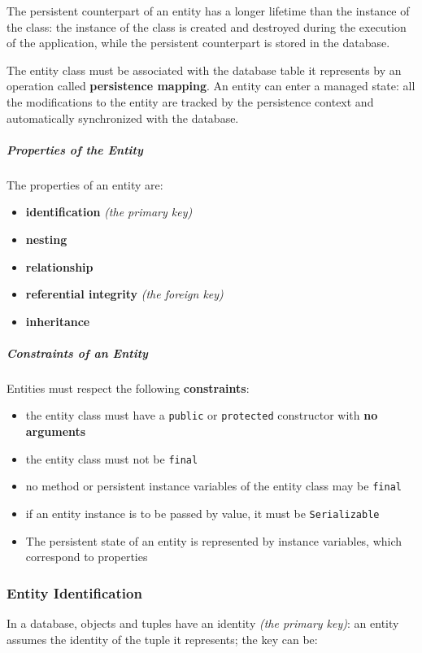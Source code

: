 \documentclass[english]{article}
\begin{document}
The persistent counterpart of an entity has a longer lifetime than the instance of the class:
the instance of the class is created and destroyed during the execution of the application, while the persistent counterpart is stored in the database.

The entity class must be associated with the database table it represents by an operation called \textbf{persistence mapping}.
An entity can enter a managed state: all the modifications to the entity are tracked by the persistence context and automatically synchronized with the database.

\subparagraph*{Properties of the Entity}
The properties of an entity are:

\begin{itemize}
  \item \textbf{identification} \textit{(the primary key)}
  \item \textbf{nesting}
  \item \textbf{relationship}
  \item \textbf{referential integrity} \textit{(the foreign key)}
  \item \textbf{inheritance}
\end{itemize}

\subparagraph*{Constraints of an Entity}

Entities must respect the following \textbf{constraints}:

\begin{itemize}
  \item the entity class must have a \texttt{public} or \texttt{protected} constructor with \textbf{no arguments}
  \item the entity class must not be \texttt{final}
  \item no method or persistent instance variables of the entity class may be \texttt{final}
  \item if an entity instance is to be passed by value, it must be \texttt{Serializable}
  \item The persistent state of an entity is represented by instance variables, which correspond to \javab properties
\end{itemize}

\subsubsection{Entity Identification}
In a database, objects and tuples have an identity \textit{(the primary key)}: an entity assumes the identity of the tuple it represents;
the key can be:
\end{document}
